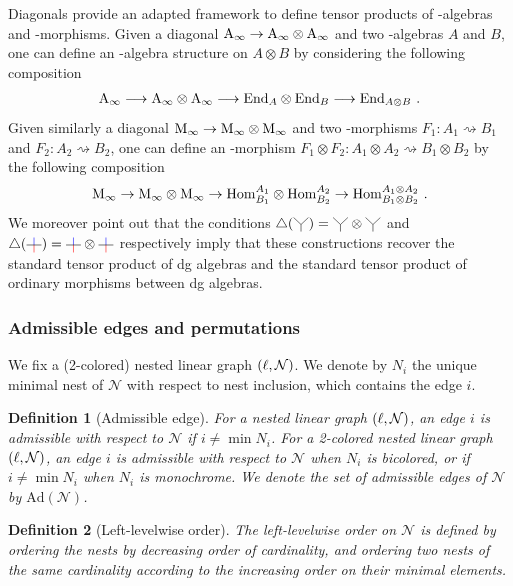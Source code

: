 \documentclass[twoside, 11pt]{amsart}
\newtheorem{definition}{Definition}[section]
\theoremstyle{remark}
\begin{document}
Diagonals provide an adapted framework to define tensor products of \Ainf -algebras and \Ainf -morphisms.
Given a diagonal $\mathrm{A}_\infty \to \mathrm{A}_\infty \otimes \mathrm{A}_\infty$ and two \Ainf -algebras $A$ and $B$, one can define an \Ainf -algebra structure on $A \otimes B$ by considering the following composition
\[ \mathrm{A}_\infty \longrightarrow \mathrm{A}_\infty \otimes \mathrm{A}_\infty \longrightarrow \mathrm{End}_A \otimes \mathrm{End}_B \longrightarrow \mathrm{End}_{A \otimes B} \ . \]
Given similarly a diagonal $\mathrm{M}_\infty \to \mathrm{M}_\infty \otimes \mathrm{M}_\infty$ and two \Ainf -morphisms $F_1 : A_1 \rightsquigarrow B_1$ and $F_2 : A_2 \rightsquigarrow B_2$, one can define an \Ainf -morphism $F_1 \otimes F_2 : A_1 \otimes A_2 \rightsquigarrow B_1 \otimes B_2$ by the following composition
\[ \Minf \rightarrow \Minf \otimes \Minf \rightarrow \Hom^{A_1}_{B_1} \otimes \Hom^{A_2}_{B_2} \rightarrow  \Hom^{A_1 \otimes A_2}_{B_1 \otimes B_2} \ . \]
We moreover point out that the conditions $\triangle (\arbreopdeux) = \arbreopdeux \otimes \arbreopdeux$ and $\triangle ( \arbreopunmorph ) = \arbreopunmorph \otimes \arbreopunmorph$ respectively imply that these constructions recover the standard tensor product of dg algebras and the standard tensor product of ordinary morphisms between dg algebras.

\subsubsection{Admissible edges and permutations}

We fix a (2-colored) nested linear graph $(\ell,\mathcal{N})$.
We denote by $N_i$ the unique minimal nest of $\mathcal{N}$ with respect to nest inclusion, which contains the edge $i$.  

\begin{definition}[Admissible edge]
For a nested linear graph $(\ell,\mathcal{N})$, an edge $i$ is \emph{admissible} with respect to $\mathcal{N}$ if $i \neq \min N_i$. 
For a 2-colored nested linear graph $(\ell,\mathcal{N})$, an edge $i$ is \emph{admissible} with respect to $\mathcal{N}$ when $N_i$ is bicolored, or if $i \neq \min N_i$ when $N_i$ is monochrome.
We denote the set of admissible edges of $\mathcal{N}$ by $\mathrm{Ad}(\mathcal{N})$. 
\end{definition}

\begin{definition} [Left-levelwise order]
\label{def:left-levelwise-graph}
The \emph{left-levelwise order} on $\mathcal{N}$ is defined by ordering the nests by decreasing order of cardinality, and ordering two nests of the same cardinality according to the increasing order on their minimal elements. 
\end{definition}
\end{document}
